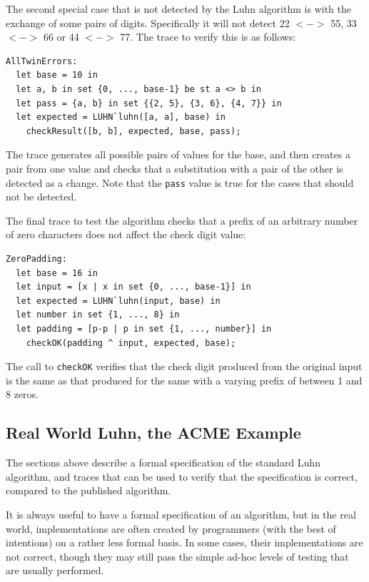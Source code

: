 \documentclass{overturerepchap}
\begin{document}
The second special case that is not detected by the Luhn algorithm is with the
exchange of some pairs of digits. Specifically it will not detect 22 $<->$ 55,
33 $<->$ 66 or 44 $<->$ 77. The trace to verify this is as follows:

\small
\begin{lstlisting}
AllTwinErrors:
  let base = 10 in
  let a, b in set {0, ..., base-1} be st a <> b in
  let pass = {a, b} in set {{2, 5}, {3, 6}, {4, 7}} in
  let expected = LUHN`luhn([a, a], base) in
    checkResult([b, b], expected, base, pass);
\end{lstlisting}
\normalsize

\noindent The trace generates all possible pairs of values for the base, and
then creates a pair from one value and checks that a substitution with a pair of the other is
detected as a change. Note that the \texttt{pass} value is true for the cases
that should not be detected.

The final trace to test the algorithm checks that a prefix of an arbitrary
number of zero characters does not affect the check digit value:

\small
\begin{lstlisting}
ZeroPadding:
  let base = 16 in
  let input = [x | x in set {0, ..., base-1}] in
  let expected = LUHN`luhn(input, base) in
  let number in set {1, ..., 8} in
  let padding = [p-p | p in set {1, ..., number}] in 
    checkOK(padding ^ input, expected, base);
\end{lstlisting}
\normalsize

\noindent The call to \texttt{checkOK} verifies that the check digit produced from the
original input is the same as that produced for the same with a varying prefix
of between 1 and 8 zeros.

\subsection{Real World Luhn, the ACME Example}

The sections above describe a formal specification of the standard Luhn
algorithm, and traces that can be used to verify that the specification is
correct, compared to the published algorithm.

It is always useful to have a formal specification of an algorithm, but in the
real world, implementations are often created by programmers (with the best of
intentions) on a rather less formal basis. In some cases, their implementations
are not correct, though they may still pass the simple ad-hoc levels of testing
that are usually performed.
\end{document}
